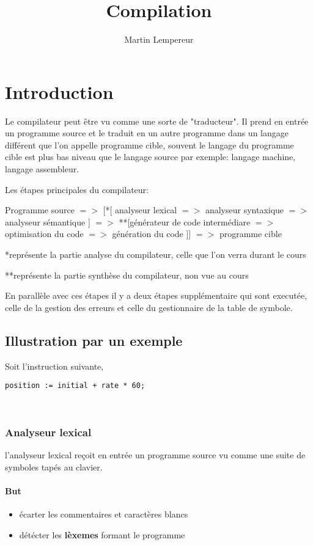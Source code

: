 \documentclass[a4paper,10pt]{report}
\title{Compilation}
\author{Martin Lempereur}
\begin{document}
\maketitle
\tableofcontents




  \chapter{Introduction}

Le compilateur peut être vu comme une sorte de "traducteur".
Il prend en entrée un programme source et le traduit en un autre programme dans un langage différent
que l'on appelle programme cible, souvent le langage du programme cible est plus bas niveau que le langage source par exemple: langage machine, langage assembleur.


Les étapes principales du compilateur:


Programme source $=>$ [*[ analyseur lexical $=>$ analyseur syntaxique $=>$ analyseur sémantique ] $=>$ **[générateur de code intermédiare $=>$ optimisation du code $=>$ génération du code ]] $=>$ programme cible

*représente la partie analyse du compilateur, celle que l'on verra durant le cours


**représente la partie synthèse du compilateur, non vue au cours

En parallèle avec ces étapes il y a deux étapes supplémentaire qui sont executée, celle de la gestion des erreurs et celle du gestionnaire de la table de symbole.

\section{Illustration par un exemple}

Soit l'instruction suivante,
\begin{lstlisting}
position := initial + rate * 60;

 
\end{lstlisting}


\subsection{Analyseur lexical}

l'analyseur lexical reçoit en entrée un programme source vu comme une suite de symboles tapés au clavier.


\subsubsection{But}
\begin{itemize}
 \item écarter les commentaires et caractères blancs
 \item détécter les \textbf{lèxemes} formant le programme
        
\end{itemize}
\end{document}
